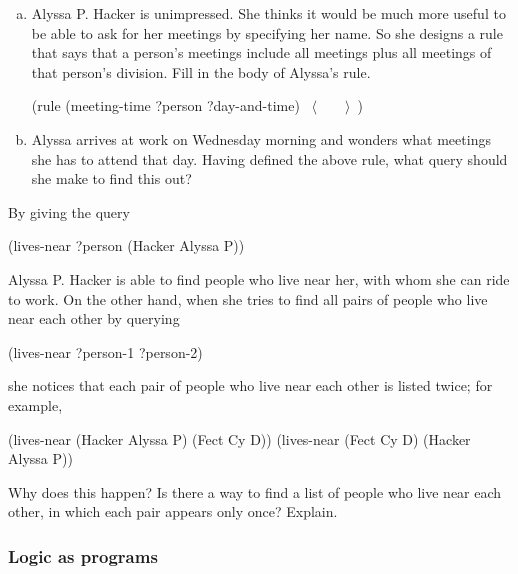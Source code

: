 \begin{exerciseGroup}
\begin{enumerate}[a.]
\item
Alyssa P. Hacker is unimpressed.  She thinks it would be much more useful to be
able to ask for her meetings by specifying her name.  So she designs a rule
that says that a person's meetings include all  meetings
plus all meetings of that person's division.  Fill in the body of Alyssa's
rule.

\begin{codeBlock}
(rule (meeting-time ?person ?day-and-time)
      ~\(\langle \)~~~~\(\rangle \)~)
\end{codeBlock}

\item
Alyssa arrives at work on Wednesday morning and wonders what meetings she has
to attend that day.  Having defined the above rule, what query should she make
to find this out?

\end{enumerate}

\label{Exercise 4.60}
 By giving the query

\begin{codeBlock}
(lives-near ?person (Hacker Alyssa P))
\end{codeBlock}

Alyssa P. Hacker is able to find people who live near her, with whom she can
ride to work.  On the other hand, when she tries to find all pairs of people
who live near each other by querying

\begin{codeBlock}
(lives-near ?person-1 ?person-2)
\end{codeBlock}

\noindent
she notices that each pair of people who live near each other is listed twice;
for example,

\begin{codeBlock}
(lives-near (Hacker Alyssa P) (Fect Cy D))
(lives-near (Fect Cy D) (Hacker Alyssa P))
\end{codeBlock}

Why does this happen?  Is there a way to find a list of people who live near
each other, in which each pair appears only once?  Explain.
\end{exerciseGroup}

\subsubsection*{Logic as programs}

